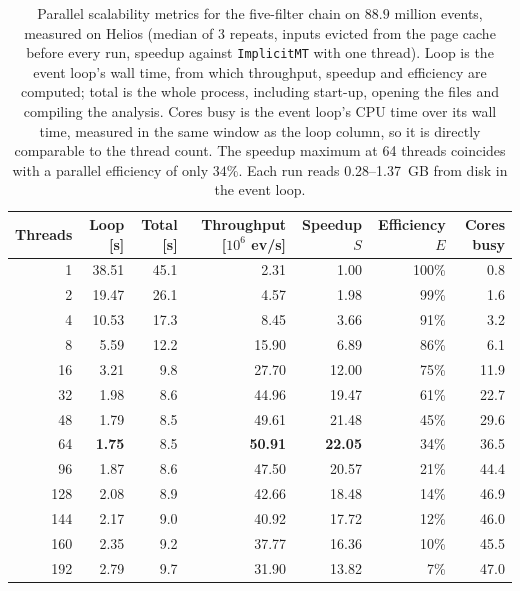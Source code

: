\begin{table}[htbp]
\centering
\caption{Parallel scalability metrics for the five-filter chain on $88.9$ million events, measured on Helios (median of 3 repeats, inputs evicted from the page cache before every run, speedup against \texttt{ImplicitMT} with one thread). Loop is the event loop's wall time, from which throughput, speedup and efficiency are computed; total is the whole process, including start-up, opening the files and compiling the analysis. Cores busy is the event loop's CPU time over its wall time, measured in the same window as the loop column, so it is directly comparable to the thread count. The speedup maximum at 64 threads coincides with a parallel efficiency of only $34\%$. Each run reads 0.28--1.37~GB from disk in the event loop.}
\label{tab:scalability-chain}
\setlength{\tabcolsep}{5pt}
\begin{tabular}{rrrrrrr}
\toprule
Threads & Loop [s] & Total [s] & Throughput [$10^6$ ev/s] & Speedup $S$ & Efficiency $E$ & Cores busy \\
\midrule
 1 & 38.51 & 45.1 & 2.31 & 1.00 & 100\% & 0.8 \\
 2 & 19.47 & 26.1 & 4.57 & 1.98 & 99\% & 1.6 \\
 4 & 10.53 & 17.3 & 8.45 & 3.66 & 91\% & 3.2 \\
 8 & 5.59 & 12.2 & 15.90 & 6.89 & 86\% & 6.1 \\
16 & 3.21 & 9.8 & 27.70 & 12.00 & 75\% & 11.9 \\
32 & 1.98 & 8.6 & 44.96 & 19.47 & 61\% & 22.7 \\
48 & 1.79 & 8.5 & 49.61 & 21.48 & 45\% & 29.6 \\
64 & \textbf{1.75} & 8.5 & \textbf{50.91} & \textbf{22.05} & 34\% & 36.5 \\
96 & 1.87 & 8.6 & 47.50 & 20.57 & 21\% & 44.4 \\
128 & 2.08 & 8.9 & 42.66 & 18.48 & 14\% & 46.9 \\
144 & 2.17 & 9.0 & 40.92 & 17.72 & 12\% & 46.0 \\
160 & 2.35 & 9.2 & 37.77 & 16.36 & 10\% & 45.5 \\
192 & 2.79 & 9.7 & 31.90 & 13.82 & 7\% & 47.0 \\
\bottomrule
\end{tabular}
\end{table}
